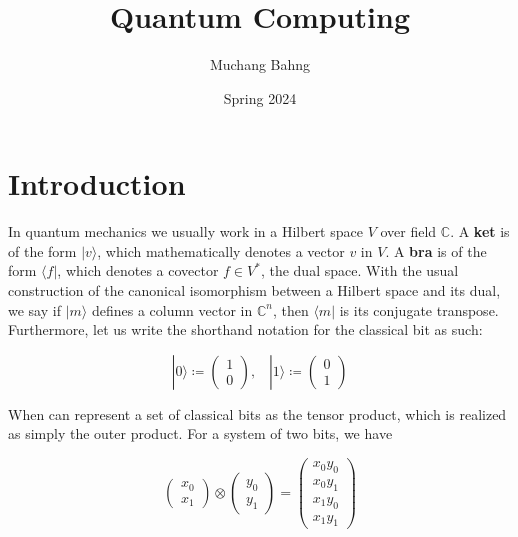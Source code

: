 \documentclass{article}
\theoremstyle{definition}
\begin{document}
\pagestyle{fancy}

\cfoot{\thepage / \pageref{LastPage}}

\title{Quantum Computing}
\author{Muchang Bahng}
\date{Spring 2024}

\maketitle
\tableofcontents
\pagebreak 


\section{Introduction}

In quantum mechanics we usually work in a Hilbert space $V$ over field $\mathbb{C}$. A \textbf{ket} is of the form $| v \rangle$, which mathematically denotes a vector $v$ in $V$. A \textbf{bra} is of the form $\langle f |$, which denotes a covector $f \in V^\ast$, the dual space. With the usual construction of the canonical isomorphism between a Hilbert space and its dual, we say if $| m \rangle$ defines a column vector in $\mathbb{C}^n$, then $\langle m |$ is its conjugate transpose. Furthermore, let us write the shorthand notation for the classical bit as such: 

  \[| 0 \rangle \coloneqq \begin{pmatrix} 1 \\ 0 \end{pmatrix} , \;\;\; | 1 \rangle \coloneqq \begin{pmatrix} 0 \\ 1 \end{pmatrix}\] 

When can represent a set of classical bits as the tensor product, which is realized as simply the outer product. For a system of two bits, we have 

  \[\begin{pmatrix} x_0 \\ x_1 \end{pmatrix} \otimes \begin{pmatrix} y_0 \\ y_1 \end{pmatrix} = \begin{pmatrix} x_0 y_0 \\ x_0 y_1 \\ x_1 y_0 \\ x_1 y_1 \end{pmatrix}\]
\end{document}
